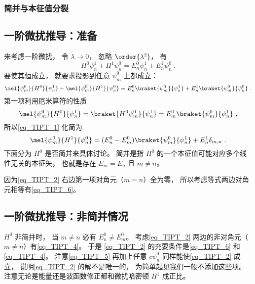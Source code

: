 \subsubsection{简并与本征值分裂}


\subsection{一阶微扰推导：准备}
来考虑一阶微扰， 令 $\lambda \to 0$， 忽略 $\order{\lambda^2}$， 有
\begin{equation}
H^0\psi_n^1 + H^1 \psi_n^0 = E_n^0 \psi_n^1 + E_n^1 \psi_n^0~.
\end{equation}
要使其恒成立， 就要求投影到任意 $\psi_m^0$ 上都成立：
\begin{equation}\label{eq_TIPT_1}
\mel{\psi_m^0}{H^0}{\psi_n^1} + \mel{\psi_m^0}{H^1}{\psi_n^0} = E_n^0 \braket{\psi_m^0}{\psi_n^1} + E_n^1 \braket{\psi_m^0}{\psi_n^0}~.
\end{equation}
第一项利用厄米算符的性质
\begin{equation}
\mel{\psi_m^0}{H^0}{\psi_n^1} = \braket{H^0\psi_m^0}{\psi_n^1} = E_m^0\braket{\psi_m^0}{\psi_n^1}~,
\end{equation}
所以\autoref{eq_TIPT_1} 化简为
\begin{equation}\label{eq_TIPT_2}
\mel{\psi_m^0}{H^1}{\psi_n^0} = (E_n^0 - E_m^0) \braket{\psi_m^0}{\psi_n^1} + E_n^1 \delta_{m,n}~.
\end{equation}
下面分为 $H^0$ 是否简并来具体讨论。 简并是指 $H^0$ 的一个本征值可能对应多个线性无关的本征矢， 也就是存在 $E_m=E_n$ 且 $m\ne n$。

因为\autoref{eq_TIPT_2} 右边第一项对角元（$m = n$）全为零， 所以考虑等式两边对角元相等有\autoref{eq_TIPT_6}。

\subsection{一阶微扰推导：非简并情况}\label{sub_TIPT_1}
$H^0$ 非简并时， 当 $m\ne n$ 必有 $E_n^0 \ne E_m^0$。  考虑\autoref{eq_TIPT_2} 两边的非对角元（$m \ne n$）有\autoref{eq_TIPT_4}。 于是 \autoref{eq_TIPT_2} 的充要条件是\autoref{eq_TIPT_6} 和\autoref{eq_TIPT_4}。 注意\autoref{eq_TIPT_5} 再加上任意 $c \psi_n^0$ 同样能使\autoref{eq_TIPT_2} 成立， 说明\autoref{eq_TIPT_2} 的解不是唯一的， 为简单起见我们一般不添加这些项。 注意无论是能量还是波函数修正都和微扰哈密顿 $H^1$ 成正比。

